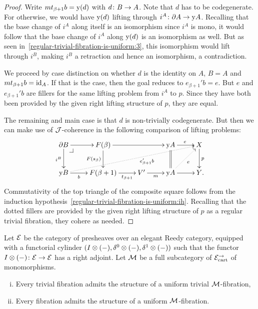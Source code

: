 \documentclass[reqno,10pt,a4paper,oneside,draft]{amsart}
\begin{document}
\begin{proof}
Write $m t_{\beta+1} b = \yon(d)$ with $d \co B \to A$.
Note that $d$ has to be codegenerate.
For otherwise, we would have $\yon(d)$ lifting through $i^A \co \partial A \to \yon A$.
Recalling that the base change of $i^A$ along itself is an isomorphism since $i^A$ is mono, it would follow that the base change of $i^A$ along $\yon(d)$ is an isomorphism as well.
But as seen in~\eqref{regular-trivial-fibration-is-uniform:3}, this isomorphism would lift through $i^B$, making $i^B$ a retraction and hence an isomorphism, a contradiction.

We proceed by case distinction on whether $d$ is the identity on $A$, \ie $B = A$ and $m t_{\beta+1} b = \id_A$.
If that is the case, then the goal reduces to $e_{\beta+1}' b = e$.
But $e$ and $e_{\beta+1}' b$ are fillers for the same lifting problem from $i^A$ to $p$.
Since they have both been provided by the given right lifting structure of $p$, they are equal.

The remaining and main case is that $d$ is non-trivially codegenerate.
But then we can make use of $\cal{J}$-coherence in the following comparison of lifting problems:
\[
\xymatrix{
  \partial B
  \ar[r]
  \ar[d]_{i^B}
  \pullback{dr}
&
  F(\beta)
  \ar[rr]
  \ar[d]_{F(s_{\beta})}
&&
  \yon A
  \ar[r]^{e}
  \ar@{=}[d]
&
  X
  \ar[d]^{p}
\\
  \yon B
  \ar[r]_-{b}
  \ar@{.>}[urrrr]_(0.6){e_{\beta+1}' b}
&
  F(\beta+1)
  \ar[r]_-{t_{\beta+1}}
&
  V'
  \ar[r]_-{m}
&
  \yon A
  \ar[r]
  \ar@{.>}[ur]_{e}
&
  Y
\rlap{.}}
\]
Commutativity of the top triangle of the composite square follows from the induction hypothesis~\eqref{regular-trivial-fibration-is-uniform:ih}.
Recalling that the dotted fillers are provided by the given right lifting structure of $p$ as a regular trivial fibration, they cohere as needed.
\end{proof}

\begin{theorem} \label{thm:ac-kan-is-uniform}
Let $\catE$ be the category of presheaves over an elegant Reedy category, equipped with a functorial cylinder $(\interval \otimes (-), \lcyl \otimes (-), \rcyl \otimes(-))$ such that the functor $\interval \otimes (-) \co \catE \to \catE$ has a right adjoint.
Let $\cal{M}$ be a full subcategory of $\cal{E}_{\cart}^\to$ of monomorphisms.
\begin{enumerate}[(i)]
\item Every trivial fibration admits the structure of a uniform trivial $\cal{M}$-fibration,
\item Every fibration admits the structure of a uniform $\cal{M}$-fibration.
\end{enumerate}
\end{theorem}
\end{document}
